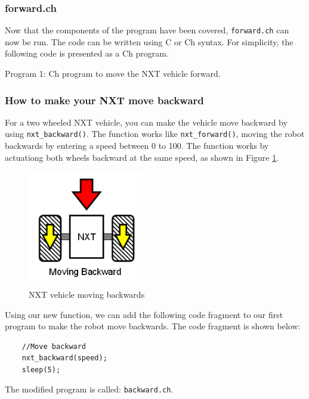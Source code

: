 \documentclass[12pt]{article}
\begin{document}
\newpage
\subsubsection{forward.ch}
Now that the components of the program have been covered, \verb+forward.ch+ can now be run. The code can 
be written using C or Ch syntax. For simplicity, the following code is presented as a Ch program.


\begin{center}
Program 1: Ch program to move the NXT vehicle forward.
\end{center}

\subsubsection{How to make your NXT move backward}
For a two wheeled NXT vehicle, you can make the vehicle move backward by using \verb+nxt_backward()+. The function works 
like \verb+nxt_forward()+, moving the robot backwards by entering a speed between 0 to 100. The function works by actuationg 
both wheels backward at the same speed, as shown in Figure \ref{fig_NXT_backward}.
\begin{figure}[h]
  \begin{center}
    \includegraphics[height=2in]{figure/mindstorm/Vehicle_back.png}
    \caption{NXT vehicle moving backwards\label{fig_NXT_backward}}
  \end{center}
\end{figure}
Using our new function, we can add the following code fragment to our first program to make the robot move backwards. 
The code fragment is shown below:
\begin{verbatim}
    //Move backward
    nxt_backward(speed);
    sleep(5);
\end{verbatim}
\noindent
The modified program is called: \verb+backward.ch+.
\end{document}
